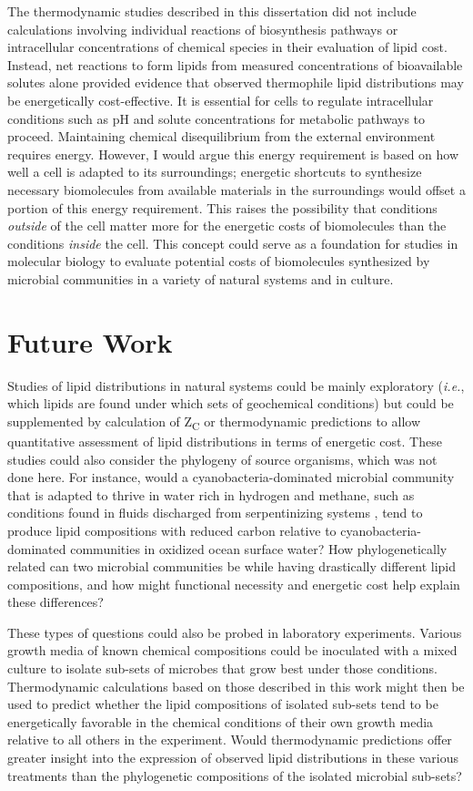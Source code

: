 The thermodynamic studies described in this dissertation did not include calculations involving individual reactions of biosynthesis pathways or intracellular concentrations of chemical species in their evaluation of lipid cost. Instead, net reactions to form lipids from measured concentrations of bioavailable solutes alone provided evidence that observed thermophile lipid distributions may be energetically cost-effective. It is essential for cells to regulate intracellular conditions such as pH and solute concentrations for metabolic pathways to proceed. Maintaining chemical disequilibrium from the external environment requires energy. However, I would argue this energy requirement is based on how well a cell is adapted to its surroundings; energetic shortcuts to synthesize necessary biomolecules from available materials in the surroundings would offset a portion of this energy requirement. This raises the possibility that conditions \textit{outside} of the cell matter more for the energetic costs of biomolecules than the conditions \textit{inside} the cell. This concept could serve as a foundation for studies in molecular biology to evaluate potential costs of biomolecules synthesized by microbial communities in a variety of natural systems and in culture.

\section{Future Work}

Studies of lipid distributions in natural systems could be mainly exploratory (\textit{i.e.}, which lipids are found under which sets of geochemical conditions) but could be supplemented by calculation of Z\textsubscript{C} or thermodynamic predictions to allow quantitative assessment of lipid distributions in terms of energetic cost. These studies could also consider the phylogeny of source organisms, which was not done here. For instance, would a cyanobacteria-dominated microbial community that is adapted to thrive in water rich in hydrogen and methane, such as conditions found in fluids discharged from serpentinizing systems \citep{mccollom2009thermodynamic}, tend to produce lipid compositions with reduced carbon relative to cyanobacteria-dominated communities in oxidized ocean surface water? How phylogenetically related can two microbial communities be while having drastically different lipid compositions, and how might functional necessity and energetic cost help explain these differences?

These types of questions could also be probed in laboratory experiments. Various growth media of known chemical compositions could be inoculated with a mixed culture to isolate sub-sets of microbes that grow best under those conditions. Thermodynamic calculations based on those described in this work might then be used to predict whether the lipid compositions of isolated sub-sets tend to be energetically favorable in the chemical conditions of their own growth media relative to all others in the experiment. Would thermodynamic predictions offer greater insight into the expression of observed lipid distributions in these various treatments than the phylogenetic compositions of the isolated microbial sub-sets?

